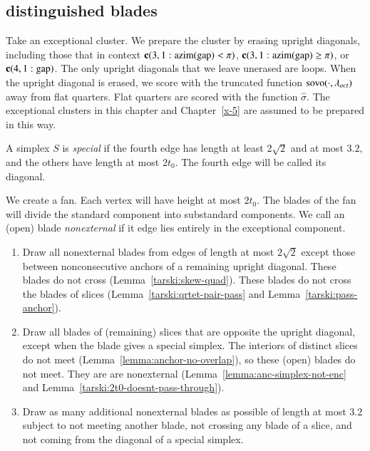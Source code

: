 \subsection{distinguished blades} %

Take an exceptional cluster.  We prepare the cluster by erasing
upright diagonals, including those that in context ${\operatorname{\bf c}}{(3,1: {\operatorname{azim}}({\operatorname{gap}}) <\pi)}$,
${\operatorname{\bf c}}{(3,1: {\operatorname{azim}}({\operatorname{gap}}) \ge \pi)}$, or ${\operatorname{\bf c}}{(4,1:{\operatorname{gap}})}$.  The only upright diagonals that we
leave unerased are loops.  When the upright diagonal is erased, we
score with the truncated function ${\operatorname{sovo}}(\cdot,\lambda_{oct})$ 
away from flat
quarters.  Flat quarters are scored with the function
$\hat\sigma$. The exceptional clusters in this chapter and Chapter~\ref{x-5} 
are assumed to be prepared in this way.


\begin{definition}[special]
A simplex $S$ is {\it special\/} if the fourth edge has length at
least $2\sqrt{2}$ and at most $3.2$, and the others have length at
most $2t_0$. The fourth edge will be called its diagonal.
\end{definition}

We create a fan.  Each vertex will have
height at most $2t_0$.  The blades of the fan
will divide the standard component into substandard components. We
call an (open) blade {\it nonexternal\/} if it
edge lies entirely in the exceptional component.

\begin{enumerate}
\item Draw all nonexternal blades from edges of length at most $2\sqrt{2}$
except those between nonconsecutive anchors of a remaining upright
diagonal. These blades do not cross (Lemma~\ref{tarski:skew-quad}).
These blades do not cross the blades of slices
(Lemma~\ref{tarski:qrtet-pair-pass} and
Lemma~\ref{tarski:pass-anchor}).

\item Draw all blades of (remaining) slices
that are opposite the upright diagonal, except when the blade gives
a special simplex. The interiors of distinct slices do
not meet (Lemma~\ref{lemma:anchor-no-overlap}), so these (open) blades do
not meet. They are are nonexternal 
(Lemma~\ref{lemma:anc-simplex-not-enc} and
Lemma~\ref{tarski:2t0-doesnt-pass-through}).

\item Draw as many additional nonexternal blades as possible of
length at most $3.2$ subject to not meeting another blade, not
crossing any blade of a slice, and not coming from  the
diagonal of a special simplex.
\end{enumerate}


